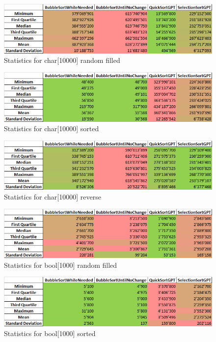 \documentclass{article}
\begin{document}
\begin{figure}[!h]
    \centering
    \includegraphics[width=0.75\linewidth]{char10000rand-stat.png}
    \caption{Statistics for char[10000] random filled}
    \label{fig:char10000rand-stat}
\end{figure}
\begin{figure}[!h]
    \centering
    \includegraphics[width=0.75\linewidth]{char10000sort-stat.png}
    \caption{Statistics for char[10000] sorted}
    \label{fig:char10000sort-stat}
\end{figure}
\begin{figure}[!h]
    \centering
    \includegraphics[width=0.75\linewidth]{char10000rev-stat.png}
    \caption{Statistics for char[10000] reverse}
    \label{fig:char10000rev-stat}
\end{figure}
\begin{figure}[!h]
    \centering
    \includegraphics[width=0.75\linewidth]{bool1000rand-stat.png}
    \caption{Statistics for bool[1000] random filled}
    \label{fig:bool1000rand-stat}
\end{figure}
\begin{figure}[!h]
    \centering
    \includegraphics[width=0.75\linewidth]{bool1000sort-stat.png}
    \caption{Statistics for bool[1000] sorted}
    \label{fig:bool1000sort-stat}
\end{figure}
\end{document}
